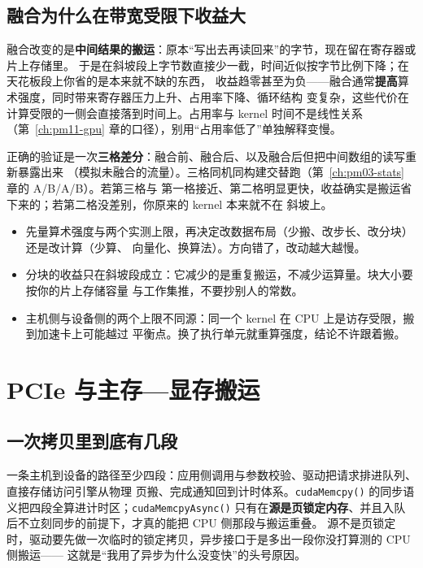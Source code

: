 \documentclass[12pt,a4paper,fontset=fandol]{ctexbook}
\newcommand{\Fn}[1]{\texttt{#1()}}
\newcommand{\Bk}{\discretionary{}{}{}}
\begin{document}
\subsection*{融合为什么在带宽受限下收益大}
融合改变的是\textbf{中间结果的搬运}：原本``写出去再读回来''的字节，现在留在寄存器或片上存储里。
于是在斜坡段上字节数直接少一截，时间近似按字节比例下降；在天花板段上你省的是本来就不缺的东西，
收益趋零甚至为负——融合通常\textbf{提高}算术强度，同时带来寄存器压力上升、占用率下降、循环结构
变复杂，这些代价在计算受限的一侧会直接落到时间上。占用率与 kernel 时间不是线性关系
（第~\ref{ch:pm11-gpu} 章的口径），别用``占用率低了''单独解释变慢。

正确的验证是一次\textbf{三格差分}：融合前、融合后、以及融合后但把中间数组的读写重新暴露出来
（模拟未融合的流量）。三格同机同构建交替跑（第~\ref{ch:pm03-stats} 章的 A/B/A/B）。若第三格与
第一格接近、第二格明显更快，收益确实是搬运省下来的；若第二格没差别，你原来的 kernel 本来就不在
斜坡上。

\begin{guideline}[title={动布局之前先定侧}]
\begin{itemize}
\item 先量算术强度与两个实测上限，再决定改数据布局（少搬、改步长、改分块）还是改计算（少算、
  向量化、换算法）。方向错了，改动越大越慢。
\item 分块的收益只在斜坡段成立：它减少的是重复搬运，不减少运算量。块大小要按你的片上存储容量
  与工作集推，不要抄别人的常数。
\item 主机侧与设备侧的两个上限不同源：同一个 kernel 在 CPU 上是访存受限，搬到加速卡上可能越过
  平衡点。换了执行单元就重算强度，结论不许跟着搬。
\end{itemize}
\end{guideline}

\section{PCIe 与主存—显存搬运}
\label{sec:pm12-pcie}

\subsection*{一次拷贝里到底有几段}
一条主机到设备的路径至少四段：应用侧调用与参数校验、驱动把请求排进队列、直接存储访问引擎从物理
页搬、完成通知回到计时体系。\Fn{cudaMemcpy} 的同步语义把四段全算进计时区；\Fn{cudaMemcpy{\Bk}Async}
只有在\textbf{源是页锁定内存}、并且入队后不立刻同步的前提下，才真的能把 CPU 侧那段与搬运重叠。
源不是页锁定时，驱动要先做一次临时的锁定拷贝，异步接口于是多出一段你没打算测的 CPU 侧搬运——
这就是``我用了异步为什么没变快''的头号原因。
\end{document}
